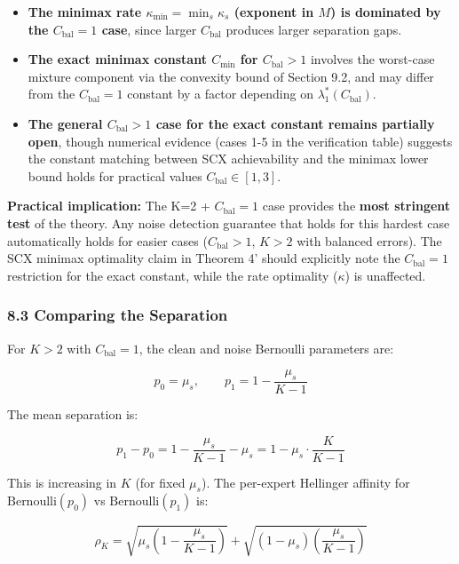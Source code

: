 \documentclass[
  12pt,
]{article}
\providecommand{\tightlist}{%
  \setlength{\itemsep}{0pt}\setlength{\parskip}{0pt}}
\begin{document}
\begin{itemize}
\tightlist
\item
  \textbf{The minimax rate \(\kappa_{\min} = \min_s \kappa_s\) (exponent
  in \(M\)) is dominated by the \(C_{\text{bal}} = 1\) case}, since
  larger \(C_{\text{bal}}\) produces larger separation gaps.
\item
  \textbf{The exact minimax constant \(C_{\min}\) for
  \(C_{\text{bal}} > 1\)} involves the worst-case mixture component via
  the convexity bound of Section 9.2, and may differ from the
  \(C_{\text{bal}}=1\) constant by a factor depending on
  \(\lambda_1^*(C_{\text{bal}})\).
\item
  \textbf{The general \(C_{\text{bal}} > 1\) case for the exact constant
  remains partially open}, though numerical evidence (cases 1-5 in the
  verification table) suggests the constant matching between SCX
  achievability and the minimax lower bound holds for practical values
  \(C_{\text{bal}} \in [1, 3]\).
\end{itemize}

\textbf{Practical implication:} The K=2 + \(C_{\text{bal}} = 1\) case
provides the \textbf{most stringent test} of the theory. Any noise
detection guarantee that holds for this hardest case automatically holds
for easier cases (\(C_{\text{bal}} > 1\), \(K > 2\) with balanced
errors). The SCX minimax optimality claim in Theorem 4' should
explicitly note the \(C_{\text{bal}} = 1\) restriction for the exact
constant, while the rate optimality (\(\kappa\)) is unaffected.

\subsubsection{8.3 Comparing the
Separation}\label{comparing-the-separation}

For \(K > 2\) with \(C_{\text{bal}} = 1\), the clean and noise Bernoulli
parameters are:

\[p_0 = \mu_s, \qquad p_1 = 1 - \frac{\mu_s}{K-1}\]

The mean separation is:

\[p_1 - p_0 = 1 - \frac{\mu_s}{K-1} - \mu_s = 1 - \mu_s \cdot \frac{K}{K-1}\]

This is increasing in \(K\) (for fixed \(\mu_s\)). The per-expert
Hellinger affinity for \(\text{Bernoulli}(p_0)\) vs
\(\text{Bernoulli}(p_1)\) is:

\[\rho_K = \sqrt{\mu_s \left(1 - \frac{\mu_s}{K-1}\right)}
        + \sqrt{(1-\mu_s) \left(\frac{\mu_s}{K-1}\right)}\]
\end{document}
